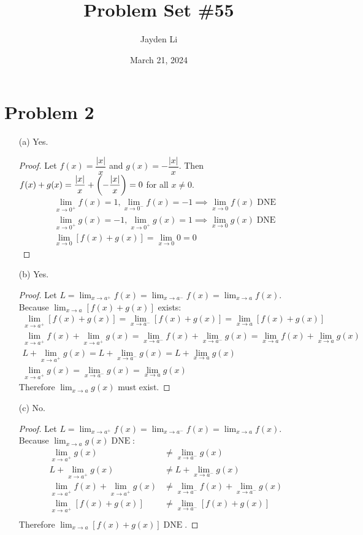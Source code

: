 \documentclass{article}
\title{Problem Set \#55}
\author{Jayden Li}
\date{March 21, 2024}
\newcommand*{\paren}[1]{\ensuremath\left(#1\right)}
\newcommand*{\problem}[1]{\section*{Problem #1}}
\newcommand*{\limit}[2][x]{\ensuremath{\displaystyle\lim_{#1\to#2}}}
\newcommand*{\Limit}[3][x]{\ensuremath{\displaystyle\lim_{#1\to#2}\left[#3\right]}}
\DeclareMathOperator{\DNE}{DNE}
\begin{document}
\fontsize{12pt}{12pt}\selectfont
\setlength{\abovedisplayskip}{0pt}
\maketitle

\problem{2}
\begin{itemize}
	\item[(a)]
	Yes.
	\begin{proof}
		Let $f(x)=\dfrac{|x|}{x}$ and $g(x)=-\dfrac{|x|}{x}$. Then $f(x)+g(x)=\dfrac{|x|}{x}+\paren{-\dfrac{|x|}{x}}=0$ for all $x\neq0$.
		\begin{gather*}
			\limit{0^+}f(x)=1,\limit{0^-}f(x)=-1\implies\limit{0}f(x)\DNE \\
			\limit{0^+}g(x)=-1,\limit{0^+}g(x)=1\implies\limit{0}g(x)\DNE \\
			\Limit{0}{f(x)+g(x)}=\limit{0}0=0
		\end{gather*}
	\end{proof}

	\item[(b)]
	Yes.
	\begin{proof}
		Let $L=\limit{a^+}f(x)=\limit{a^-}f(x)=\limit{a}f(x)$. Because $\Limit{a}{f(x)+g(x)}$ exists:
		\begin{gather*}
			 \Limit{a^+}{f(x)+g(x)}=\Limit{a^-}{f(x)+g(x)}=\Limit{a}{f(x)+g(x)} \\
			\limit{a^+}f(x)+\limit{a^+}g(x)=\limit{a^-}f(x)+\limit{a^-}g(x)=\limit{a}f(x)+\limit{a}g(x) \\
			L+\limit{a^+}g(x)=L+\limit{a^-}g(x)=L+\limit{a}g(x) \\
			\limit{a^+}g(x)=\limit{a^-}g(x)=\limit{a}g(x)
		\end{gather*}
		Therefore $\limit{a}g(x)$ must exist.
	\end{proof}

	\item[(c)]
	No.
	\begin{proof}
		Let $L=\limit{a^+}f(x)=\limit{a^-}f(x)=\limit{a}f(x)$. Because $\limit{a}g(x)\DNE$:
		\begin{align*}
			\limit{a^+}g(x)&\neq\limit{a^-}g(x) \\
			L+\limit{a^+}g(x)&\neq L+\limit{a^-}g(x) \\
			\limit{a^+}f(x)+\limit{a^+}g(x)&\neq\limit{a^-}f(x)+\limit{a^-}g(x) \\
			\Limit{a^+}{f(x)+g(x)}&\neq\Limit{a^-}{f(x)+g(x)} \\
		\end{align*}
		Therefore $\Limit{a}{f(x)+g(x)}\DNE$.
	\end{proof}
\end{itemize}
\end{document}
